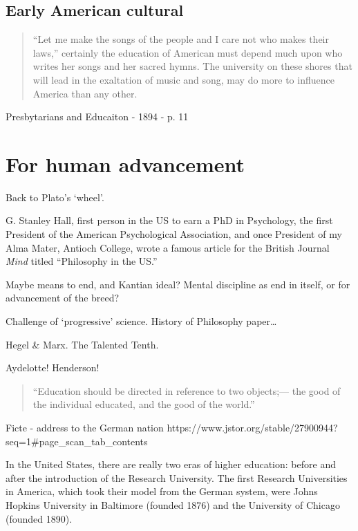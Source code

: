 \section{Early American cultural}
\label{earlyamericancultural}

\begin{quote}

``Let me make the songs of the people and I care not who makes their laws,'' certainly the education of American must depend much upon who writes her songs and her sacred hymns. The university on these shores that will lead in the exaltation of music and song, may do more to influence America than any other.
\end{quote}

Presbytarians and Educaiton - 1894 - p. 11

\chapter{For human advancement}
\label{forhumanadvancement}

Back to Plato's `wheel'. 

G. Stanley Hall, first person in the US to earn a PhD in Psychology, the first President of the American Psychological Association, and once President of my Alma Mater, Antioch College, wrote a famous article for the British Journal \emph{Mind} titled ``Philosophy in the US.'' 

Maybe means to end, and Kantian ideal? Mental discipline as end in itself, or for advancement of the breed?

Challenge of `progressive' science. History of Philosophy paper{\ldots}

Hegel \& Marx. The Talented Tenth.

Aydelotte! Henderson!

\begin{quote}

``Education should be directed in reference to two objects;--- the good of the individual educated, and the good of the world.'' ~\citep[p. 420]{Fisk:1832vk}
\end{quote}

Ficte - address to the German nation
https:\slash \slash www.jstor.org\slash stable\slash 27900944?seq=1\#page\_scan\_tab\_contents ~\citep{Turnbull:1923di}

In the United States, there are really two eras of higher education: before and after the introduction of the Research University. The first Research Universities in America, which took their model from the German system, were Johns Hopkins University in Baltimore (founded 1876) and the University of Chicago (founded 1890). 


